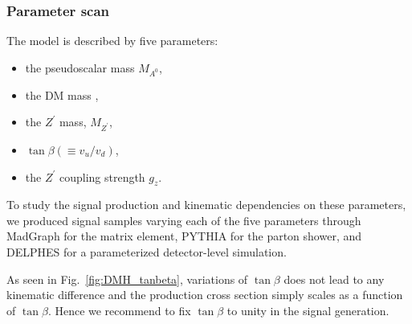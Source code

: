  
\subsubsection{Parameter scan}
 
 The model is described by five parameters:
 \begin{itemize}
 	\item the pseudoscalar mass $M_{A^0}$,
 	\item the DM mass \mdm, 	 
 	\item the $Z^\prime$ mass, $M_{Z^\prime}$,
    \item $\tan{\beta} (\equiv v_u/v_d)$,
 	\item the $Z^\prime$ coupling strength $g_z$. 
 \end{itemize}

 To study the signal production and kinematic dependencies on these parameters, 
 we produced signal samples varying each of the five parameters through 
 MadGraph for the matrix element, PYTHIA for the parton shower, and DELPHES\cite{deFavereau:2013fsa} 
for a parameterized detector-level simulation.
 
 As seen in Fig.~\ref{fig:DMH_tanbeta}, variations of $\tan{\beta}$ does not lead to any kinematic 
 difference and the production cross section simply scales as a function of $\tan{\beta}$. Hence 
we recommend to fix $\tan{\beta}$ to unity in the signal generation. 


